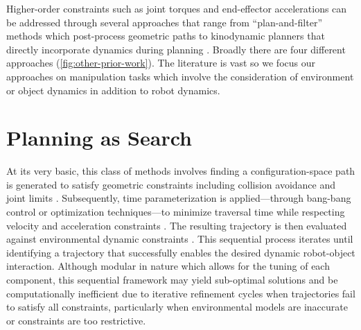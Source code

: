 
Higher-order constraints such as joint torques and end-effector accelerations can be addressed through several approaches that range from ``plan-and-filter'' methods which post-process geometric paths \cite{abderezaei2024clutter,kuntz2019fast} to kinodynamic planners that directly incorporate dynamics during planning \cite{li2016asymptotically,nayak2022bidirectional}.
Broadly there are four different approaches (\cref{fig:other-prior-work}). The literature is vast so we focus our approaches on manipulation tasks which involve the consideration of environment or object dynamics in addition to robot dynamics.



\section{Planning as Search}
At its very basic, this class of methods involves finding a configuration-space path is generated to satisfy geometric constraints including collision avoidance and joint limits \cite{orthey2023sampling}. Subsequently, time parameterization is applied---through bang-bang control or optimization techniques---to minimize traversal time while respecting velocity and acceleration constraints \cite{pham2018new,berscheid2021jerk}. The resulting trajectory is then evaluated against environmental dynamic constraints \cite{gaz2019dynamic}. This sequential process iterates until identifying a trajectory that successfully enables the desired dynamic robot-object interaction.
Although modular in nature which allows for the tuning of each component, this sequential framework may yield sub-optimal solutions and be computationally inefficient due to iterative refinement cycles when trajectories fail to satisfy all constraints, particularly when environmental models are inaccurate or constraints are too restrictive.

